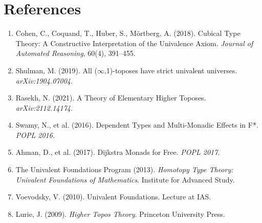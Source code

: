 \documentclass[11pt,a4paper]{report}
\theoremstyle{definition}
\theoremstyle{plain}
\begin{document}
\chapter{References}
\label{app:references}

\begin{enumerate}
  \item Cohen, C., Coquand, T., Huber, S., M\"ortberg, A. (2018). Cubical Type Theory: A Constructive Interpretation of the Univalence Axiom. \textit{Journal of Automated Reasoning}, 60(4), 391--455.
  \item Shulman, M. (2019). All ($\infty$,1)-toposes have strict univalent universes. \textit{arXiv:1904.07004}.
  \item Rasekh, N. (2021). A Theory of Elementary Higher Toposes. \textit{arXiv:2112.14174}.
  \item Swamy, N., et al. (2016). Dependent Types and Multi-Monadic Effects in F*. \textit{POPL 2016}.
  \item Ahman, D., et al. (2017). Dijkstra Monads for Free. \textit{POPL 2017}.
  \item The Univalent Foundations Program (2013). \textit{Homotopy Type Theory: Univalent Foundations of Mathematics}. Institute for Advanced Study.
  \item Voevodsky, V. (2010). Univalent Foundations. Lecture at IAS.
  \item Lurie, J. (2009). \textit{Higher Topos Theory}. Princeton University Press.
\end{enumerate}
\end{document}
